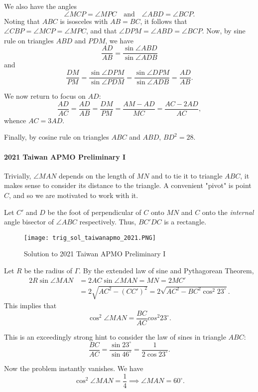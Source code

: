\documentclass[../jarvis.tex]{subfiles}
\begin{document}
We also have the angles $$\angle MCP=\angle MPC\quad\text{and}\quad \angle ABD=\angle BCP.$$
Noting that $ABC$ is isosceles with $AB=BC$, it follows that $\angle CBP=\angle MCP=\angle MPC$, and that $\angle DPM=\angle ABD=\angle BCP$. Now, by sine rule on triangles $ABD$ and $PDM$, we have
$$\frac{AD}{AB}=\frac{\sin{\angle ABD}}{\sin{\angle ADB}}$$
and 
$$\frac{DM}{PM}=\frac{\sin{\angle DPM}}{\sin{\angle PDM}}=\frac{\sin{\angle DPM}}{\sin{\angle ADB}}=\frac{AD}{AB}.$$

We now return to focus on $AD$:
$$\frac{AD}{AC}=\frac{AD}{AB}=\frac{DM}{PM}=\frac{AM-AD}{MC}=\frac{AC-2AD}{AC},$$
whence $AC=3AD$.

Finally, by cosine rule on triangles $ABC$ and $ABD$, $BD^2=\boxed{28}.$
\paragraph{2021 Taiwan APMO Preliminary I}
Trivially, $\angle MAN$ depends on the length of $MN$ and to tie it to triangle $ABC$, it makes sense to consider its distance to the triangle. A convenient "pivot" is point $C$, and so we are motivated to work with it.

Let $C'$ and $D$ be the foot of perpendicular of $C$ onto $MN$ and $C$ onto the \textit{internal} angle bisector of $\angle ABC$ respectively. Thus, $BC'DC$ is a rectangle.
\begin{figure}[H]
    \centering
    \texttt{[image: trig\_sol\_taiwanapmo\_2021.PNG]}
    \caption{Solution to 2021 Taiwan APMO Preliminary I}
\end{figure}
Let $R$ be the radius of $\Gamma$. By the extended law of sine and Pythagorean Theorem,
\begin{align*}
    2R\sin{\angle MAN}&=2AC\sin{\angle MAN}=MN=2MC'\\
    &=2\sqrt{AC^2-(CC')^2}=2\sqrt{AC^2-BC^2\cos^2{23^{\circ}}}.
\end{align*}
This implies that $$\cos^2{\angle MAN}=\frac{BC}{AC}cos^2{23^{\circ}}.$$

This is an exceedingly strong hint to consider the law of sines in triangle $ABC$:
$$\frac{BC}{AC}=\frac{\sin{23^{\circ}}}{\sin{46^{\circ}}}=\frac{1}{2\cos{23^{\circ}}}.$$

Now the problem instantly vanishes. We have
$$\cos^2{\angle MAN}=\frac{1}{4} \implies \angle MAN=\boxed{60^{\circ}}.$$
\end{document}
